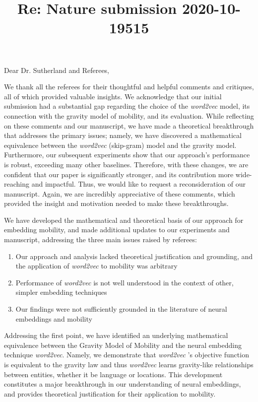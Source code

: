 \documentclass[12pt,a4paper]{article}
\title{Re: Nature submission 2020-10-19515}
\date{}
\makeatletter
\renewcommand{\maketitle}{\bgroup\setlength{\parindent}{0pt}
\begin{flushleft}
\Large  \textbf{\@title}
\end{flushleft}\egroup
}
\makeatother
\begin{document}
\maketitle

\bigskip
\thispagestyle{empty}
\vspace{-0.4cm}
\noindent Dear Dr. Sutherland and Referees,\\
\vspace{-0.25cm}

We thank all the referees for their thoughtful and helpful comments and critiques, all of which provided valuable insights.
We acknowledge that our initial submission had a substantial gap regarding the choice of the \textit{word2vec} model, its connection with the gravity model of mobility, and its evaluation.
While reflecting on these comments and our manuscript, we have made a theoretical breakthrough that addresses the primary issues;
namely, we have discovered a mathematical equivalence between the \textit{word2vec} (skip-gram) model and the gravity model.
Furthermore, our subsequent experiments show that our approach's performance is robust, exceeding many other baselines.
Therefore, with these changes, we are confident that our paper is significantly stronger, and its contribution more wide-reaching and impactful.
Thus, we would like to request a reconsideration of our manuscript.
Again, we are incredibly appreciative of these comments, which provided the insight and motivation needed to make these breakthroughs.

We have developed the mathematical and theoretical basis of our approach for embedding mobility, and made additional updates to our experiments and manuscript, addressing the three main issues raised by referees:
\vspace{-0.1cm}
\begin{enumerate}
	\itemsep0em
	\item Our approach and analysis lacked theoretical justification and grounding, and the application of \textit{word2vec} to mobility was arbitrary
	\item Performance of \textit{word2vec} is not well understood in the context of other, simpler embedding techniques
	\item Our findings were not sufficiently grounded in the literature of neural embeddings and mobility
\end{enumerate}
\vspace{-0.1cm}
Addressing the first point, we have identified an underlying mathematical equivalence between the Gravity Model of Mobility and the neural embedding technique \textit{word2vec}.
Namely, we demonstrate that \textit{word2vec} 's objective function is equivalent to the gravity law and thus \textit{word2vec} learns gravity-like relationships between entities, whether it be language or locations.
This development constitutes a major breakthrough in our understanding of neural embeddings, and provides theoretical justification for their application to mobility.
\end{document}
